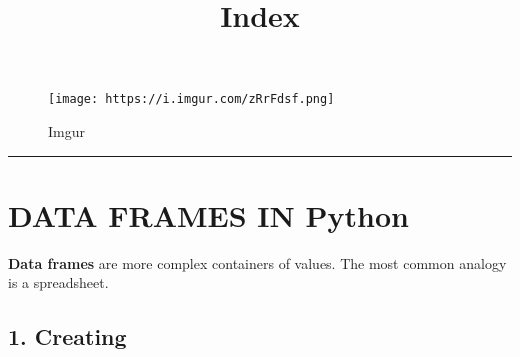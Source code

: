 \documentclass[11pt]{article}
\title{Index}
\begin{document}
    
    \maketitle
    
    

    
    \begin{figure}
\centering
\texttt{[image: https://i.imgur.com/zRrFdsf.png]}
\caption{Imgur}
\end{figure}

\begin{center}\rule{0.5\linewidth}{0.5pt}\end{center}

    \hypertarget{data-frames-in-python}{%
\section{DATA FRAMES IN Python}\label{data-frames-in-python}}

    \textbf{Data frames} are more complex containers of values. The most
common analogy is a spreadsheet.

    \hypertarget{creating}{%
\subsection{1. Creating}\label{creating}}
\end{document}

